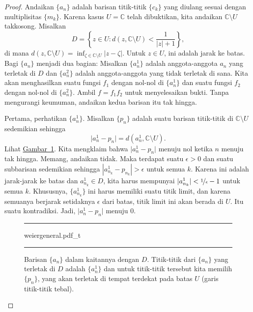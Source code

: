 \documentclass[12pt,openany]{book}
\newcommand{\sabs}[1]{\lvert {#1} \rvert}
\newcommand{\abs}[1]{\left\lvert {#1} \right\rvert}
\newcommand{\C}{{\mathbb{C}}}
\theoremstyle{plain}
\theoremstyle{remark}
\theoremstyle{definition}
\newenvironment{myfig}{%
\begin{figure}[h!t]
\noindent\rule{\textwidth}{0.5pt}\vspace{12pt}\par\centering}%
{\par\noindent\rule{\textwidth}{0.5pt}
\end{figure}}
\theoremstyle{exercise}
\theoremstyle{example}
\newcommand{\figureref}[1]{\hyperref[#1]{Gambar~\ref*{#1}}}
\begin{document}
\begin{proof}
Andaikan $\{ a_n \}$ adalah barisan titik-titik $\{ c_k \}$ yang diulang
sesuai dengan multiplisitas $\{ m_k \}$.
Karena kasus $U=\C$ telah dibuktikan, kita andaikan $\C \setminus
U$ takkosong.
Misalkan
\begin{equation*}
D = \left\{ z \in U :
d(z,\C \setminus U) < \frac{1}{\sabs{z}+1}
\right\} ,
\end{equation*}
di mana $d(z,\C\setminus U) = \inf_{\zeta \in \C \setminus U}
\sabs{z-\zeta}$.  Untuk $z \in U$, ini adalah jarak ke batas.
Bagi $\{ a_n \}$ menjadi dua bagian:
Misalkan $\{ a^1_n \}$ adalah anggota-anggota $a_n$ yang terletak di $D$ dan $\{ a^2_n \}$
adalah anggota-anggota yang tidak terletak di sana.
Kita akan menghasilkan suatu fungsi $f_1$ dengan nol-nol di $\{ a^1_n \}$ dan
suatu fungsi $f_2$ dengan nol-nol di $\{ a^2_n \}$.  Ambil $f = f_1 f_2$
untuk menyelesaikan bukti.
Tanpa mengurangi keumuman, andaikan kedua barisan itu tak hingga.

Pertama, perhatikan $\{ a^1_n \}$.  Misalkan $\{ p_n \}$ adalah suatu barisan titik-titik di
$\C \setminus U$ sedemikian
sehingga
\begin{equation*}
\sabs{a^1_n-p_n} = d(a^1_n,\C \setminus U).
\end{equation*}
Lihat \figureref{fig:weiergeneral}.
Kita mengklaim bahwa 
$\sabs{a^1_n-p_n}$ menuju nol ketika $n$ menuju tak hingga.
Memang, andaikan tidak.  Maka terdapat suatu $\epsilon > 0$ dan
suatu subbarisan sedemikian sehingga 
$\abs{a^1_{n_k}-p_{n_k}} > \epsilon$ untuk semua $k$.  Karena ini adalah
jarak-jarak ke batas dan $a^1_{n_k} \in D$,
kita harus mempunyai $\sabs{a^1_{n_k}} < \nicefrac{1}{\epsilon}-1$ untuk semua $k$.
Khususnya, $\{ a^1_{n_k} \}$ ini harus memiliki suatu titik limit, dan karena semuanya
berjarak setidaknya $\epsilon$ dari batas, titik limit ini akan berada
di $U$.  Itu suatu kontradiksi.  Jadi,
$\sabs{a^1_n-p_n}$ menuju $0$.

\begin{myfig}
{weiergeneral.pdf_t}
\caption{Barisan $\{ a_n \}$ dalam kaitannya dengan $D$.  Titik-titik 
dari $\{ a_n \}$ yang terletak di $D$ adalah $\{ a^1_n \}$ dan untuk titik-titik tersebut kita
memilih $\{ p_n \}$, yang akan terletak di tempat terdekat pada batas
$U$ (garis titik-titik tebal).\label{fig:weiergeneral}}
\end{myfig}


\end{proof}
\end{document}
